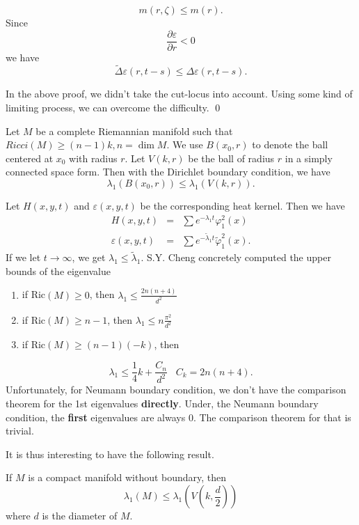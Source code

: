 \[ m (r, \zeta ) \leq m (r). \]
%
Since 
\[ \frac{\partial \varepsilon}{\partial r} < 0 \]
%
we have 
%
\[ \tilde{\Delta} \varepsilon (r, t-s) \leq \Delta \varepsilon (r, t - s). \]

In the above proof, we didn't take the cut-locus into account. Using some kind of limiting process, we can overcome the difficulty.
\qed

\begin{theorem}Let $M$ be a complete Riemannian manifold such that $ Ricci (M) \geq (n-1) k , n = \dim M$. We use $ B (x_0, r) $ to denote the ball centered at $ x _0$ with radius $r$. Let $ V (k, r)$ be the ball of radius $r$ in a simply connected space form. Then with the Dirichlet boundary condition, we have 
%
\[ \lambda _1 (B (x_0, r)) \leq \lambda _1 (V (k, r)).\]
\end{theorem}

 Let $H(x, y, t) $ and $ \varepsilon (x, y, t) $ be the corresponding heat kernel. Then we have 
%
\begin{eqnarray*}
 H (x, y, t) &=& \sum e^{-\lambda _1t}  \varphi ^2 _1 (x) \\
\varepsilon (x, y, t) & = & \sum e^{-\tilde{\lambda} _1t}  \tilde{\varphi} ^2 _1 (x).
\end{eqnarray*}
If we let $ t \rightarrow \infty$, we get $ \lambda _1 \leq \tilde{\lambda}_1 $.
S.Y. Cheng concretely computed the upper bounds of the eigenvalue
\begin{enumerate}
  \item if   Ric$(M) \geq 0$, then $ \lambda _1 \leq \frac{2n(n+4)}{d^2} $ 
  \item if   Ric$(M) \geq n-1$, then $ \lambda _1  \leq n\frac{\pi^2}{d^2} $
  \item if   Ric$(M) \geq (n-1) (-k) $, then 
  \end{enumerate}  
\[ \lambda_1 \leq \frac{1}{4} k + \frac{C_n}{d^2} \;\;\; C_k = 2n (n+4).\]
%
Unfortunately, for Neumann boundary condition, we don't have the comparison theorem for the 1st eigenvalues {\bf directly}. Under, the Neumann boundary condition, the {\bf first} eigenvalues are always 0. The comparison theorem for that is trivial.

It is thus interesting to have the following result.

\begin{theorem}If $M$ is a compact manifold without boundary, then 
%
\[ \lambda _1 (M) \leq \lambda _1 \left(V \left(k, \frac{d}{2}\right)\right)\]
%
where $d$ is the diameter of $M$.
\end{theorem}

